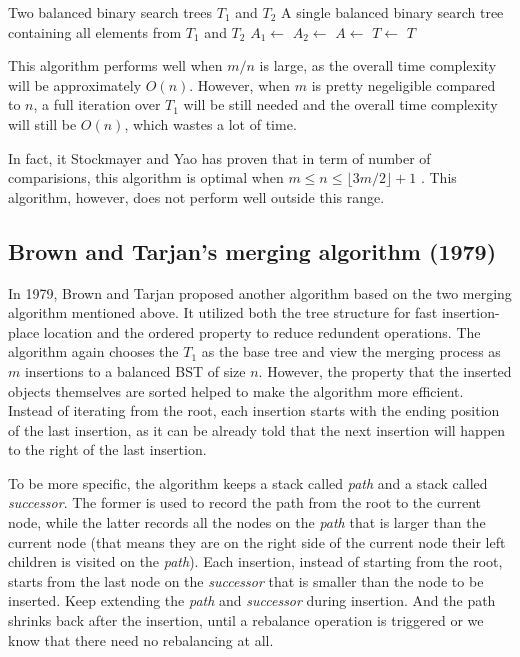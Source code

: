 \documentclass[12pt]{article}
\begin{document}
\begin{tcolorbox}[colback=orange!5!white, colframe=orange!75!black, title=Algorithm: In-order traversal merge]
\begin{algorithmic}[1]
\Require Two balanced binary search trees $T_1$ and $T_2$
\Ensure A single balanced binary search tree containing all elements from $T_1$ and $T_2$
    \State $A_1 \gets$ 
    \State $A_2 \gets$ 
    \State $A \gets$ 
    \State $T \gets$ 
    \State \Return $T$
\EndProcedure
\end{algorithmic}
\end{tcolorbox}

This algorithm performs well when $m/n$ is large, as the overall time complexity will be approximately $O(n)$. However, when $m$ is pretty negeligible compared to $n$, a full iteration over $T_1$ will be still needed and the overall time complexity will still be $O(n)$, which wastes a lot of time.

In fact, it Stockmayer and Yao has proven that in term of number of comparisions, this algorithm is optimal when $m\le n\le \lfloor 3m/2 \rfloor +1$ \cite{stockmeyer1980optimality}. This algorithm, however, does not perform well outside this range. 

\subsection{Brown and Tarjan's merging algorithm (1979)}

In 1979, Brown and Tarjan proposed another algorithm based on the two merging algorithm mentioned above. It utilized both the tree structure for fast insertion-place location and the ordered property to reduce redundent operations. The algorithm again chooses the $T_1$ as the base tree and view the merging process as $m$ insertions to a balanced BST of size $n$. However, the property that the inserted objects themselves are sorted helped to make the algorithm more efficient. Instead of iterating from the root, each insertion starts with the ending position of the last insertion, as it can be already told that the next insertion will happen to the right of the last insertion. 

To be more specific, the algorithm keeps a stack called \textit{path} and a stack called \textit{successor}. The former is used to record the path from the root to the current node, while the latter records all the nodes on the \textit{path} that is larger than the current node (that means they are on the right side of the current node their left children is visited on the \textit{path}). Each insertion, instead of starting from the root, starts from the last node on the \textit{successor} that is smaller than the node to be inserted. Keep extending the \textit{path} and \textit{successor} during insertion. And the path shrinks back after the insertion, until a rebalance operation is triggered or we know that there need no rebalancing at all.
\end{document}
